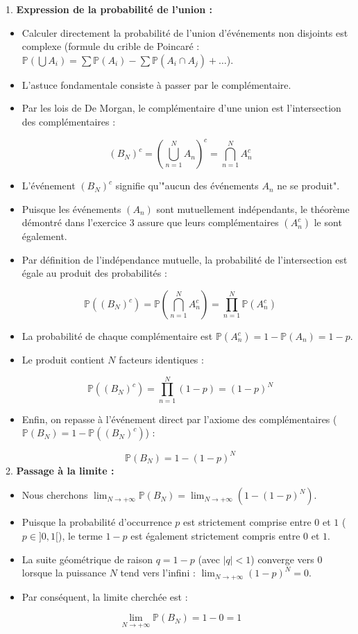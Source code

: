 \documentclass[11pt,a4paper]{article}
\begin{document}
1. \textbf{Expression de la probabilité de l'union :}
\begin{itemize}
\item Calculer directement la probabilité de l'union d'événements non disjoints est complexe (formule du crible de Poincaré : $\mathbb{P}(\bigcup A_i) = \sum \mathbb{P}(A_i) - \sum \mathbb{P}(A_i \cap A_j) + \dots$).
\item L'astuce fondamentale consiste à passer par le complémentaire.
\item Par les lois de De Morgan, le complémentaire d'une union est l'intersection des complémentaires :
\end{itemize}     $$ (B_N)^c = \left( \bigcup_{n=1}^N A_n \right)^c = \bigcap_{n=1}^N A_n^c $$
\begin{itemize}
\item L'événement $(B_N)^c$ signifie qu'"aucun des événements $A_n$ ne se produit".
\item Puisque les événements $(A_n)$ sont mutuellement indépendants, le théorème démontré dans l'exercice 3 assure que leurs complémentaires $(A_n^c)$ le sont également.
\item Par définition de l'indépendance mutuelle, la probabilité de l'intersection est égale au produit des probabilités :
\end{itemize}     $$ \mathbb{P}((B_N)^c) = \mathbb{P}\left(\bigcap_{n=1}^N A_n^c\right) = \prod_{n=1}^N \mathbb{P}(A_n^c) $$
\begin{itemize}
\item La probabilité de chaque complémentaire est $\mathbb{P}(A_n^c) = 1 - \mathbb{P}(A_n) = 1 - p$.
\item Le produit contient $N$ facteurs identiques :
\end{itemize}     $$ \mathbb{P}((B_N)^c) = \prod_{n=1}^N (1 - p) = (1 - p)^N $$
\begin{itemize}
\item Enfin, on repasse à l'événement direct par l'axiome des complémentaires ($\mathbb{P}(B_N) = 1 - \mathbb{P}((B_N)^c)$) :
\end{itemize}     $$ \mathbb{P}(B_N) = 1 - (1 - p)^N $$
2. \textbf{Passage à la limite :}
\begin{itemize}
\item Nous cherchons $\lim_{N \to +\infty} \mathbb{P}(B_N) = \lim_{N \to +\infty} \left( 1 - (1 - p)^N \right)$.
\item Puisque la probabilité d'occurrence $p$ est strictement comprise entre $0$ et $1$ ($p \in ]0, 1[$), le terme $1 - p$ est également strictement compris entre $0$ et $1$.
\item La suite géométrique de raison $q = 1 - p$ (avec $|q| < 1$) converge vers $0$ lorsque la puissance $N$ tend vers l'infini : $\lim_{N \to +\infty} (1 - p)^N = 0$.
\item Par conséquent, la limite cherchée est :
\end{itemize}     $$ \lim_{N \to +\infty} \mathbb{P}(B_N) = 1 - 0 = 1 $$
\end{document}
